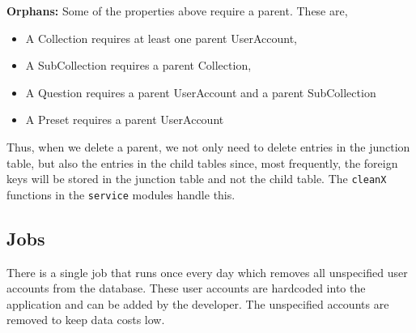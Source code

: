 \documentclass{article}
\begin{document}
\textbf{Orphans:} Some of the properties above require a parent. These are,
\begin{itemize}
    \item A Collection requires at least one parent UserAccount,
    \item A SubCollection requires a parent Collection,
    \item A Question requires a parent UserAccount and a parent SubCollection
    \item A Preset requires a parent UserAccount
\end{itemize}
Thus, when we delete a parent, we not only need to delete entries in the junction table, but also the entries in the child tables since, most frequently, the foreign keys will be stored in the junction table and not the child table. The \texttt{cleanX} functions in the \texttt{service} modules handle this.

\subsection{Jobs}
There is a single job that runs once every day which removes all unspecified user accounts from the database. These user accounts are hardcoded into the application and can be added by the developer. The unspecified accounts are removed to keep data costs low.
\end{document}
